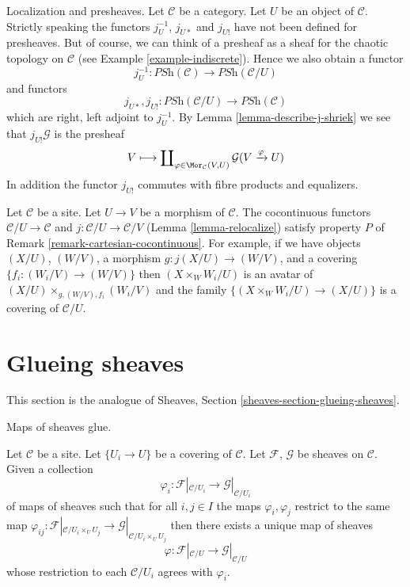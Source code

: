 \begin{remark}
\label{remark-localize-presheaves}
Localization and presheaves. Let $\mathcal{C}$ be a category.
Let $U$ be an object of $\mathcal{C}$. Strictly speaking the functors
$j_U^{-1}$, $j_{U*}$ and $j_{U!}$ have not been defined for presheaves.
But of course, we can think of a presheaf as a sheaf for the
chaotic topology on $\mathcal{C}$ (see Example \ref{example-indiscrete}).
Hence we also obtain a functor
$$
j_U^{-1} :
\textit{PSh}(\mathcal{C})
\longrightarrow
\textit{PSh}(\mathcal{C}/U)
$$
and functors
$$
j_{U*}, j_{U!} :
\textit{PSh}(\mathcal{C}/U)
\longrightarrow
\textit{PSh}(\mathcal{C})
$$
which are right, left adjoint to $j_U^{-1}$. By
Lemma \ref{lemma-describe-j-shriek}
we see that $j_{U!}\mathcal{G}$ is the presheaf
$$
V \longmapsto
\coprod\nolimits_{\varphi \in \Mor_\mathcal{C}(V, U)}
\mathcal{G}(V \xrightarrow{\varphi} U)
$$
In addition the functor $j_{U!}$ commutes with fibre products and
equalizers.
\end{remark}

\begin{remark}
\label{remark-localization-cartesian-cocontinuous}
Let $\mathcal{C}$ be a site. Let $U \to V$ be a morphism of $\mathcal{C}$.
The cocontinuous functors $\mathcal{C}/U \to \mathcal{C}$ and
$j : \mathcal{C}/U \to \mathcal{C}/V$ (Lemma \ref{lemma-relocalize})
satisfy property $P$ of Remark \ref{remark-cartesian-cocontinuous}.
For example, if we have objects $(X/U)$, $(W/V)$, a morphism
$g : j(X/U) \to (W/V)$, and a covering $\{f_i  : (W_i/V) \to (W/V)\}$ then
$(X \times_W W_i/U)$ is an avatar of $(X/U) \times_{g, (W/V), f_i} (W_i/V)$
and the family $\{(X \times_W W_i/U) \to (X/U)\}$ is a covering
of $\mathcal{C}/U$.
\end{remark}






\section{Glueing sheaves}
\label{section-glueing-sheaves}

\noindent
This section is the analogue of
Sheaves, Section \ref{sheaves-section-glueing-sheaves}.

\begin{lemma}
\label{lemma-glue-maps}
\begin{slogan}
Maps of sheaves glue.
\end{slogan}
Let $\mathcal{C}$ be a site.
Let $\{U_i \to U\}$ be a covering of $\mathcal{C}$.
Let $\mathcal{F}$, $\mathcal{G}$ be sheaves on $\mathcal{C}$.
Given a collection
$$
\varphi_i :
\mathcal{F}|_{\mathcal{C}/U_i}
\longrightarrow
\mathcal{G}|_{\mathcal{C}/U_i}
$$
of maps of sheaves such that for all $i, j \in I$ the maps
$\varphi_i, \varphi_j$ restrict to the same map
$\varphi_{ij} : \mathcal{F}|_{\mathcal{C}/U_i \times_U U_j} \to
\mathcal{G}|_{\mathcal{C}/U_i \times_U U_j}$
then there exists a unique map of sheaves
$$
\varphi :
\mathcal{F}|_{\mathcal{C}/U}
\longrightarrow
\mathcal{G}|_{\mathcal{C}/U}
$$
whose restriction to each $\mathcal{C}/U_i$ agrees with $\varphi_i$.
\end{lemma}

